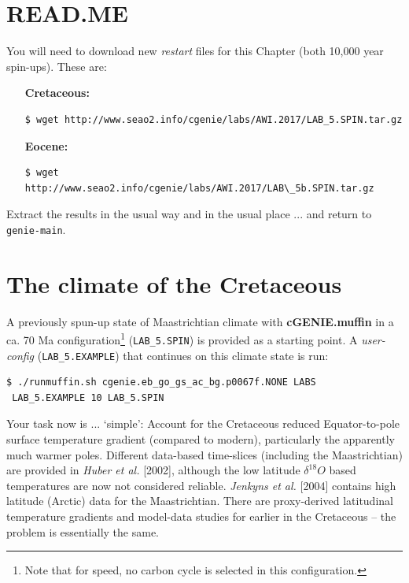 \documentclass[11pt,fleqn]{book} %
\begin{document}

\newpage


\section*{READ.ME}

You will need to download new \textit{restart} files for this Chapter (both 10,000 year spin-ups). These are:

\vspace{2mm}
\begin{enumerate}[noitemsep]
\item[\textbf{Cretaceous:}]
\begin{verbatim}
$ wget http://www.seao2.info/cgenie/labs/AWI.2017/LAB_5.SPIN.tar.gz
\end{verbatim}
\item[\textbf{Eocene:}]
\begin{verbatim}
$ wget http://www.seao2.info/cgenie/labs/AWI.2017/LAB\_5b.SPIN.tar.gz
\end{verbatim}
\end{enumerate}
\vspace{2mm}

Extract the results in the usual way and in the usual place ... and return to \texttt{genie-main}.


\newpage


\section{The climate of the Cretaceous}

A previously spun-up state of Maastrichtian climate with \textbf{cGENIE.muffin} in a ca. 70 Ma configuration\footnote{Note that for speed, no carbon cycle is selected in this configuration.} (\texttt{LAB\_5.SPIN}) is provided as a starting point. A \textit{user-config} (\texttt{LAB\_5.EXAMPLE}) that continues on this climate state is run:
\begin{verbatim}
$ ./runmuffin.sh cgenie.eb_go_gs_ac_bg.p0067f.NONE LABS 
 LAB_5.EXAMPLE 10 LAB_5.SPIN 
\end{verbatim}

Your task now is ... ‘simple’: Account for the Cretaceous reduced Equator-to-pole surface temperature gradient (compared to modern), particularly the apparently much warmer poles. Different data-based time-slices (including the Maastrichtian) are provided in \textit{Huber et al.} [2002], although the low latitude \(\delta^{18}O\) based temperatures are now not considered reliable. \textit{Jenkyns et al.} [2004] contains high latitude (Arctic) data for the Maastrichtian. There are proxy-derived latitudinal temperature gradients and model-data studies for earlier in the Cretaceous – the problem is essentially the same.
\end{document}
